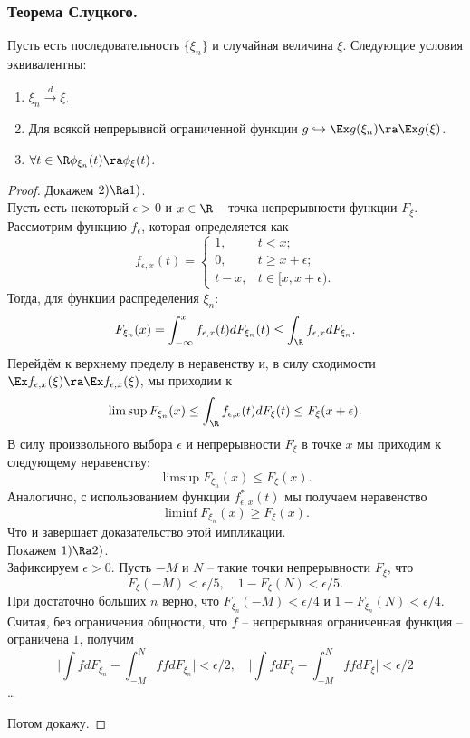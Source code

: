 \subsubsection{Теорема Слуцкого.}
\begin{theorem}
    Пусть есть последовательность $\{\xi_n\}$ и случайная величина $\xi$.
    Следующие условия эквивалентны:
    \begin{enumerate}
        \item $\xi_n \xrightarrow{d} \xi$.
        \item Для всякой непрерывной ограниченной функции $g \hookrightarrow \Ex g(\xi_n) \ra \Ex g(\xi)$.
        \item $\forall t \in \R \phi_{\xi_n}(t) \ra \phi_{\xi}(t)$.
    \end{enumerate}
\end{theorem}
\begin{proof}
    Докажем $2) \Ra 1)$. \\
    Пусть есть некоторый $\epsilon > 0$ и $x \in \R$ -- точка непрерывности функции $F_{\xi}$. Рассмотрим функцию $f_\epsilon$, которая определяется как
    \[
        f_{\epsilon, x}(t) =
        \begin{cases}
            1, & t < x; \\
            0, & t \geq x + \epsilon; \\
            t - x, & t \in [x, x + \epsilon).
        \end{cases}
    \]
    Тогда, для функции распределения $\xi_n$:
    \[
        F_{\xi_n}(x) = \int_{-\infty}^x f_{\epsilon, x}(t)dF_{\xi_n}(t) \leq \int_{\R} f_{\epsilon, x}dF_{\xi_n}.
    \]
    Перейдём к верхнему пределу в неравенству и, в силу сходимости $\Ex f_{\epsilon, x}(\xi) \ra \Ex f_{\epsilon, x}(\xi)$, мы приходим к
    \[
        \limsup F_{\xi_n}(x) \leq \int_{\R} f_{\epsilon, x}(t)dF_{\xi}(t) \leq F_{\xi}(x + \epsilon).
    \]
    В силу произвольного выбора $\epsilon$ и непрерывности $F_{\xi}$ в точке $x$ мы приходим к следующему неравенству:
    \[
        \limsup F_{\xi_n}(x) \leq F_{\xi}(x).
    \]
    Аналогично, с использованием функции $f^*_{\epsilon, x}(t)$ мы получаем неравенство
    \[
        \liminf F_{\xi_n}(x) \geq F_{\xi}(x).
    \]
    Что и завершает доказательство этой импликации. \\
    Покажем $1) \Ra 2)$. \\
    Зафиксируем $\epsilon > 0$.
    Пусть $-M$ и $N$ -- такие точки непрерывности $F_{\xi}$, что
    \[
        F_\xi(-M) < \epsilon/5, \quad 1 - F_\xi(N) < \epsilon/5.
    \]
    При достаточно больших $n$ верно, что $F_{\xi_n}(-M) < \epsilon/4$ и $1 - F_{\xi_n}(N) < \epsilon/4$.
    Считая, без ограничения общности, что $f$ -- непрерывная ограниченная функция -- ограничена $1$, получим
    \[
        \biggr|\int fdF_{\xi_n} - \int_{-M}^{N} f fdF_{\xi_n}\biggr| < \epsilon/2, \quad \biggr|\int fdF_{\xi} - \int_{-M}^{N} f fdF_{\xi}\biggr| < \epsilon/2
    \]
    \ldots

    Потом докажу.
\end{proof}
